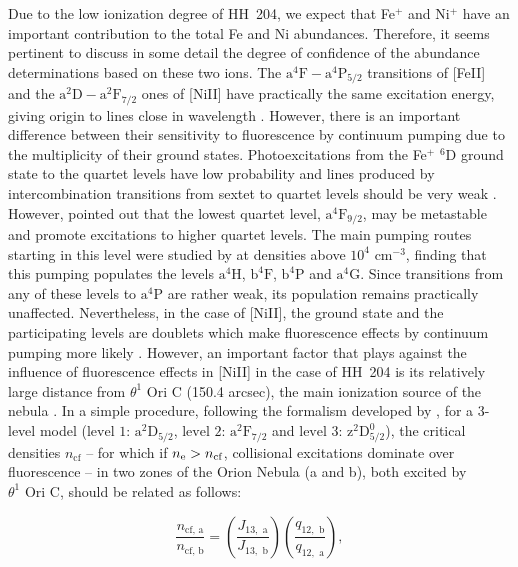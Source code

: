 \documentclass[twocolumn]{aastex63}
\begin{document}
Due to the low ionization degree of HH~204, we expect that Fe$^{+}$ and Ni$^{+}$ have an important contribution to the total Fe and Ni abundances. Therefore, it seems pertinent to discuss in some detail the degree of confidence of the abundance determinations based on these two ions. 
The $\text{a}^{4}\text{F}-\text{a}^{4}\text{P}_{5/2}$ transitions of [Fe\thinspace II] and the $\text{a}^{2}\text{D}-\text{a}^{2}\text{F}_{7/2}$ ones of [Ni\thinspace II] have practically the same excitation energy, giving origin to lines close in wavelength \citep{Bautista96}. However, there is an important difference between their sensitivity to fluorescence by continuum pumping due to the  multiplicity of their ground states. Photoexcitations from the Fe$^{+}$ $^6\text{D}$ ground state to the quartet levels have low probability and lines produced by  intercombination transitions from sextet to quartet levels should be very weak \citep{Bautista98}. However, \citet{rodriguez99} pointed out that the lowest quartet level,  $\text{a}^{4}\text{F}_{9/2}$, may be metastable and promote excitations to higher quartet levels. The main pumping routes starting in this level were studied by \citet{verner00} at densities  above $10^4 \text{ cm}^{-3}$, finding that this pumping populates the levels $\text{a}^{4}\text{H}$, $\text{b}^{4}\text{F}$, $\text{b}^{4}\text{P}$ and $\text{a}^{4}\text{G}$. Since transitions from any of these levels to $\text{a}^{4}\text{P}$ are rather weak, its population remains practically unaffected. Nevertheless, in the case of [Ni\thinspace II], the ground state and the participating levels are doublets which make fluorescence effects by continuum pumping more likely  \citep{Bautista96}. However, an important factor that plays against the influence of fluorescence effects in [Ni\thinspace II] in the case of HH~204 is its relatively large distance from $\theta^{1} \text{ Ori C}$ (150.4 arcsec), the main ionization source of the nebula \citep{ODell:2015a, odell17_ionizing}. In a simple procedure, following the formalism developed by \citet[][their equation 8]{Bautista96},   for a 3-level model ($\text{level 1: }\text{a}^2\text{D}_{5/2}$, $\text{level 2: } \text{a}^2\text{F}_{7/2}$ and $\text{level 3: }\text{z}^2\text{D}^{0}_{5/2}$), the critical densities $n_{\text{cf}}$ -- for which if $n_{\rm e}>n_{\text{cf}}$, collisional excitations dominate over fluorescence -- in two zones of the Orion Nebula (a and b), both excited by $\theta^{1} \text{ Ori C}$, should be related as follows:

\begin{equation}
    \label{eq:ni2}
    \frac{n_{\text{cf, a}}}{n_{\text{cf, b}}}=\left( \frac{J_{13,\text{ a}}}{J_{13,\text{ b}}}\right)\left( \frac{q_{12,\text{ b}}}{q_{12,\text{ a}}} \right),
\end{equation}
\end{document}
